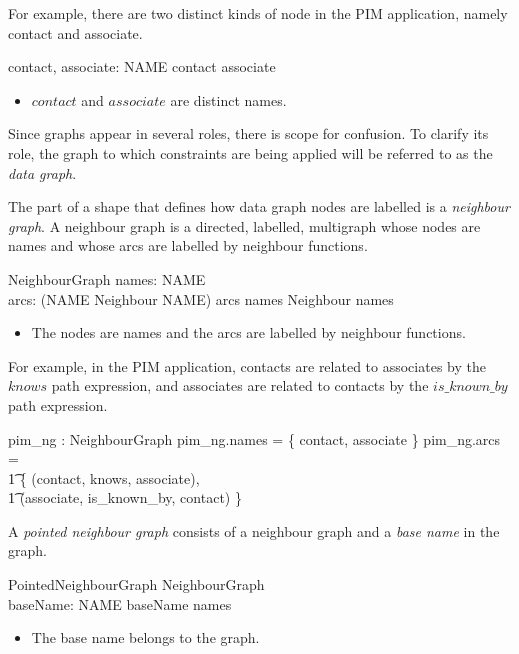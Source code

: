 \documentclass{article}
\begin{document}
For example, there are two distinct kinds of node in the PIM application, namely contact and associate.
\begin{axdef}
	contact, associate: NAME
\where
	contact \neq associate
\end{axdef}
\begin{itemize}
\item $contact$ and $associate$ are distinct names.
\end{itemize}

Since graphs appear in several roles, there is scope for confusion.
To clarify its role, the graph to which constraints are being applied will be referred to as the {\em data graph}.

The part of a shape that defines how data graph nodes are labelled is a {\em neighbour graph}.
A neighbour graph is a directed, labelled, multigraph whose nodes are names and whose
arcs are labelled by neighbour functions.
\begin{schema}{NeighbourGraph}
	names: \finset NAME \\
	arcs: \finset (NAME \cross Neighbour \cross NAME)
\where
	arcs \subseteq names \cross Neighbour \cross names
\end{schema}
\begin{itemize}
\item The nodes are names and the arcs are labelled by neighbour functions.
\end{itemize}

For example, in the PIM application, contacts are related to associates by the $knows$ path expression, and associates
are related to contacts by the $is\_known\_by$ path expression.
\begin{axdef}
	pim\_ng : NeighbourGraph
\where
	pim\_ng.names = \{ contact, associate \}
\also
	pim\_ng.arcs = \\
\t1		\{ (contact, knows, associate), \\
\t1		(associate, is\_known\_by, contact) \}
\end{axdef}

A {\em pointed neighbour graph} consists of a neighbour graph and a {\em base name} in the graph.
\begin{schema}{PointedNeighbourGraph}
	NeighbourGraph \\
	baseName: NAME
\where
	baseName \in names
\end{schema}
\begin{itemize}
\item The base name belongs to the graph.
\end{itemize}
\end{document}
